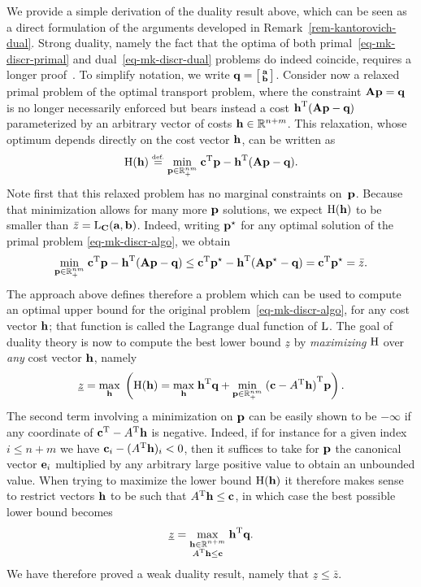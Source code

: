 \begin{rem}\label{rem-duality} We provide a simple derivation of the duality result above, which can be seen as a direct formulation of the arguments developed in Remark~\ref{rem-kantorovich-dual}. Strong duality, namely the fact that the optima of both primal~\eqref{eq-mk-discr-primal} and dual~\eqref{eq-mk-discr-dual} problems do indeed coincide, requires a longer proof~\citep[\S4.10]{bertsimas1997introduction}. To simplify notation, we write $\mathrm{\textbf{q}}=\bigl[\begin{smallmatrix}\mathrm{\textbf{a}}\\ \mathrm{\textbf{b}} \end{smallmatrix} \bigr]$. 
Consider now a relaxed primal problem of the optimal transport problem, where the constraint $\mathbf{A}\mathrm{\textbf{p}}=\mathrm{\textbf{q}}$ is no longer necessarily enforced but bears instead a cost ${\mathrm{\textbf{h}}}^{\mathrm{T}}(\mathbf{A}\mathrm{\textbf{p}}-\mathrm{\textbf{q}})$ parameterized by an arbitrary vector of costs $\mathrm{\textbf{h}}\in\mathbb{R}^{n+m}$. 
This relaxation, whose optimum depends directly on the cost vector $\mathrm{\textbf{h}}$, can be written as
$$\LagrangeMKD(\hD)\eqdef \umin{\p \in \RR^{nm}_+} \transp{\cc}\p-\transp{\hD}(\mathbf{A}\p-\q).$$ 
Note first that this relaxed problem has no marginal constraints on~$\mathrm{\textbf{p}}$. Because that minimization allows for many more $\mathrm{\textbf{p}}$ solutions, we expect $\mathrm{H}(\mathrm{\textbf{h}})$ to be smaller than $\bar{z}=\mathrm{L}_{\mathrm{\textbf{C}}}(\mathrm{\textbf{a}},\mathrm{\textbf{b}})$. Indeed, writing $\mathrm{\textbf{p}}^\star$ for any optimal solution of the primal problem \eqref{eq-mk-discr-algo}, we obtain
$$\underset{\mathrm{\textbf{p}} \in \mathbb{R}^{nm}_+}{\min}\; {\mathrm{\textbf{c}}}^{\mathrm{T}}\mathrm{\textbf{p}}-{\mathrm{\textbf{h}}}^{\mathrm{T}}(\mathbf{A}\mathrm{\textbf{p}}-\mathrm{\textbf{q}}) \leq {\mathrm{\textbf{c}}}^{\mathrm{T}}\mathrm{\textbf{p}}^\star-{\mathrm{\textbf{h}}}^{\mathrm{T}}(\mathbf{A}\mathrm{\textbf{p}}^\star-\mathrm{\textbf{q}})={\mathrm{\textbf{c}}}^{\mathrm{T}}\mathrm{\textbf{p}}^\star=\bar{z}.$$
The approach above defines therefore a problem which can be used to compute an optimal upper bound for the original problem~\eqref{eq-mk-discr-algo}, for any cost vector $\mathrm{\textbf{h}}$; that function is called the Lagrange dual function of $\mathrm{L}$. 
The goal of duality theory is now to compute the best lower bound $\underline{z}$ by \emph{maximizing} $\mathrm{H}$ over \emph{any} cost vector $\mathrm{\textbf{h}}$, namely
$$
	\underline{z}=\underset{\mathrm{\textbf{h}}}{\max}\; \left(  \mathrm{H}(\mathrm{\textbf{h}})=\underset{\mathrm{\textbf{h}}}{\max}\; {\mathrm{\textbf{h}}}^{\mathrm{T}}\mathrm{\textbf{q}} + \underset{\mathrm{\textbf{p}} \in \mathbb{R}^{nm}_+}{\min}\; {(\mathrm{\textbf{c}}-{A}^{\mathrm{T}}\mathrm{\textbf{h}})}^{\mathrm{T}}\mathrm{\textbf{p}}  \right).
$$
The second term involving a minimization on $\mathrm{\textbf{p}}$ can be easily shown to be $-\infty$ if any coordinate of ${\mathrm{\textbf{c}}}^{\mathrm{T}}- {A}^{\mathrm{T}}\mathrm{\textbf{h}}$ is negative. 
Indeed, if for instance for a given index $i\leq n+m$ we have $\mathrm{\textbf{c}}_i-({A}^{\mathrm{T}}\mathrm{\textbf{h}})_i<0$, then it suffices to take for $\mathrm{\textbf{p}}$ the canonical vector $\mathrm{\textbf{e}}_i$ multiplied by any arbitrary large positive value to obtain an unbounded value. 
When trying to maximize the lower bound $\mathrm{H}(\mathrm{\textbf{h}})$ it therefore makes sense to restrict vectors $\mathrm{\textbf{h}}$ to be such that ${A}^{\mathrm{T}}\mathrm{\textbf{h}}\leq \mathrm{\textbf{c}}$, in which case the best possible lower bound becomes $$\underline{z}=	\underset{\substack{\mathrm{\textbf{h}} \in \mathbb{R}^{n+m}\\{A}^{\mathrm{T}}\mathrm{\textbf{h}} \leq \mathrm{\textbf{c}}}}{\max}\;{\mathrm{\textbf{h}}}^{\mathrm{T}}\mathrm{\textbf{q}}.$$ We have therefore proved a weak duality result, namely that $\underline{z}\leq \bar{z}$.
\end{rem}


